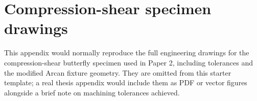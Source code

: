\chapter{Compression-shear specimen drawings}
\label{Appendix:Appendix1}

This appendix would normally reproduce the full engineering drawings for the
compression-shear butterfly specimen used in Paper 2, including tolerances
and the modified Arcan fixture geometry. They are omitted from this starter
template; a real thesis appendix would include them as PDF or vector figures
alongside a brief note on machining tolerances achieved.
